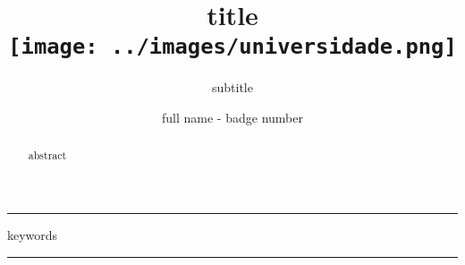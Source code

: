 \documentclass[12pt, a4paper]{paper}
\title{title \\
  \hfill\texttt{[image: ../images/universidade.png]}
  \vspace{-3cm}
}
\subtitle{subtitle}
\author{full name - badge number}
\begin{document}
\maketitle

\hrule
\begin{abstract}
  abstract
\end{abstract}
\vspace{-0.6cm} %
\begin{keywords}
  keywords
\end{keywords}
\hrule
\end{document}
